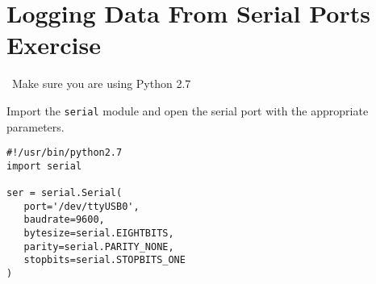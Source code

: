 \documentclass[a4paper,11pt]{article}
\begin{document}
\section{Logging Data From Serial Ports Exercise}

{\center~Make sure you are using Python 2.7}

\begin{question}
Import the \texttt{serial} module and 
open the serial port with the appropriate parameters.
\end{question}
\newsavebox\serbasic
\begin{lrbox}{\serbasic}
\begin{minipage}{\textwidth}
\begin{verbatim}
#!/usr/bin/python2.7
import serial

ser = serial.Serial(
   port='/dev/ttyUSB0',
   baudrate=9600,
   bytesize=serial.EIGHTBITS,
   parity=serial.PARITY_NONE,
   stopbits=serial.STOPBITS_ONE
)
\end{verbatim}
\end{minipage}
\end{lrbox}
\end{document}
